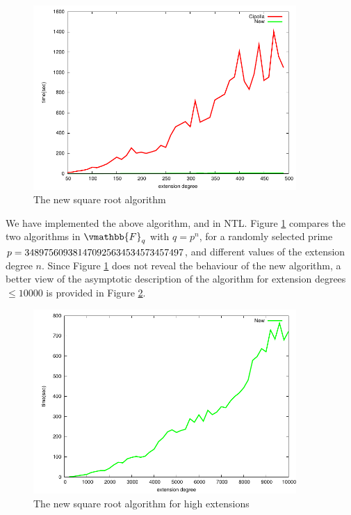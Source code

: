 \begin{figure}[ht]
\setlength{\abovecaptionskip}{-0.5cm}
\begin{center}
\includegraphics[width = 10cm]{figures/sqrtTiming.pdf}
\end{center}
\caption{\small The new square root algorithm}
\label{figure:sqrtTiming}
\end{figure}

We have implemented the above algorithm, and  in NTL. Figure 
\ref{figure:sqrtTiming} compares the two algorithms in $\vmathbb{F}_q$ with $q = p^n$, for a randomly 
selected prime $p = \seqsplit{348975609381470925634534573457497}$, and different values of the 
extension degree $n$. Since Figure \ref{figure:sqrtTiming} does not reveal the behaviour of the new 
algorithm, a better view of the asymptotic  description of the algorithm for extension degrees $\le 
10000$ is provided in Figure \ref{figure:sqrtTimingHDeg}.

\begin{figure}[ht]
\setlength{\abovecaptionskip}{-0.5cm}
\begin{center}
\includegraphics[width = 10cm]{figures/sqrtTimingHDeg.pdf}
\end{center}
\caption{\small The new square root algorithm for high extensions}
\label{figure:sqrtTimingHDeg}
\end{figure}










